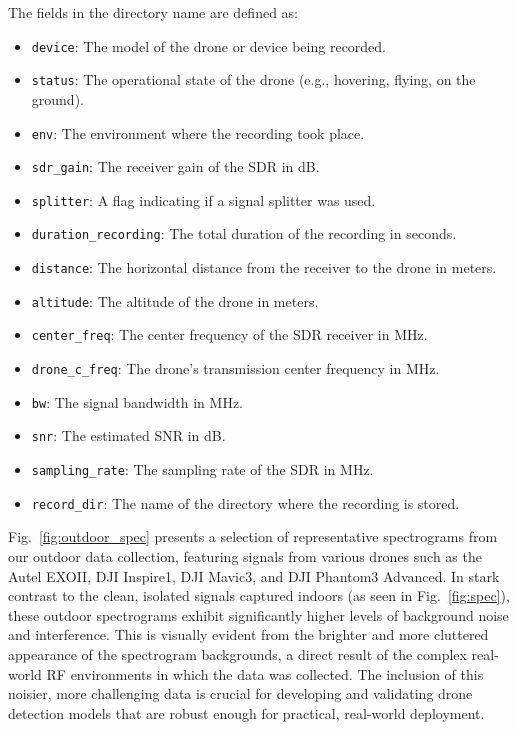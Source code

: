 The fields in the directory name are defined as:
\begin{itemize}
    \item \texttt{device}: The model of the drone or device being recorded.
    \item \texttt{status}: The operational state of the drone (e.g., hovering, flying, on the ground).
    \item \texttt{env}: The environment where the recording took place.
    \item \texttt{sdr\_gain}: The receiver gain of the SDR in dB.
    \item \texttt{splitter}: A flag indicating if a signal splitter was used.
    \item \texttt{duration\_recording}: The total duration of the recording in seconds.
    \item \texttt{distance}: The horizontal distance from the receiver to the drone in meters.
    \item \texttt{altitude}: The altitude of the drone in meters.
    \item \texttt{center\_freq}: The center frequency of the SDR receiver in MHz.
    \item \texttt{drone\_c\_freq}: The drone's transmission center frequency in MHz.
    \item \texttt{bw}: The signal bandwidth in MHz.
    \item \texttt{snr}: The estimated SNR in dB.
    \item \texttt{sampling\_rate}: The sampling rate of the SDR in MHz.
    \item \texttt{record\_dir}: The name of the directory where the recording is stored.
\end{itemize}

Fig.~\ref{fig:outdoor_spec} presents a selection of representative spectrograms from our outdoor data collection, featuring signals from various drones such as the Autel EXOII, DJI Inspire1, DJI Mavic3, and DJI Phantom3 Advanced. In stark contrast to the clean, isolated signals captured indoors (as seen in Fig.~\ref{fig:spec}), these outdoor spectrograms exhibit significantly higher levels of background noise and interference. This is visually evident from the brighter and more cluttered appearance of the spectrogram backgrounds, a direct result of the complex real-world RF environments in which the data was collected. The inclusion of this noisier, more challenging data is crucial for developing and validating drone detection models that are robust enough for practical, real-world deployment.


